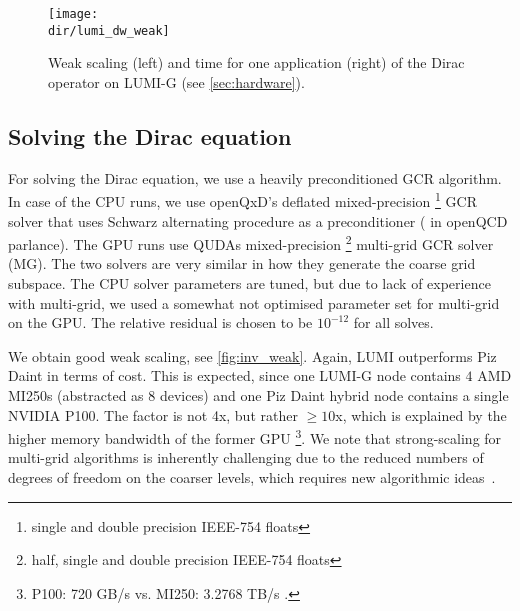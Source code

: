 \begin{figure}
    \centering
    \texttt{[image: \\dir/lumi\_dw\_weak]}
    \caption{Weak scaling (left) and time for one application (right) of the Dirac operator on LUMI-G (see \cref{sec:hardware}).}
    \label{fig:lumi_dw_weak}
\end{figure}

\subsection{Solving the Dirac equation}

For solving the Dirac equation, we use a heavily preconditioned GCR algorithm. In case of the CPU runs, we use openQxD's deflated mixed-precision%
\footnote{single and double precision IEEE-754 floats} GCR solver that uses Schwarz alternating procedure as a preconditioner ( in openQCD parlance). The GPU runs use QUDAs mixed-precision%
\footnote{half, single and double precision IEEE-754 floats} multi-grid GCR solver (MG). The two solvers are very similar in how they generate the coarse grid subspace. The CPU solver parameters are tuned, but due to lack of experience with multi-grid, we used a somewhat not optimised parameter set for multi-grid on the GPU. The relative residual is chosen to be $10^{-12}$ for all solves.

We obtain good weak scaling, see \cref{fig:inv_weak}. Again, LUMI outperforms Piz Daint in terms of cost. This is expected, since one LUMI-G node contains $4$ AMD MI250s (abstracted as $8$ devices) and one Piz Daint hybrid node contains a single NVIDIA P100. The factor is not 4x, but rather $\ge10$x, which is explained by the higher memory bandwidth of the former GPU \footnote{P100: 720 GB/s \cite{nv_p100} vs. MI250: 3.2768 TB/s \cite{amd_mi250}.}.
We note that strong-scaling for multi-grid algorithms is inherently challenging due to the reduced numbers of degrees of freedom on the coarser levels, which requires new algorithmic ideas~\cite{Espinoza-Valverde:2022pci}.



